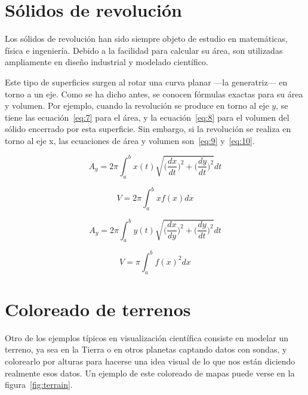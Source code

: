 \section{Sólidos de revolución}
\label{ref:revolution}

Los sólidos de revolución han sido siempre objeto de estudio en matemáticas,
física e ingeniería. Debido a la facilidad para calcular su área, son utilizadas
ampliamente en diseño industrial y modelado científico.

Este tipo de superficies surgen al rotar una curva planar ---la generatriz--- en
torno a un eje. Como se ha dicho antes, se conocen fórmulas exactas para su área
y volumen. Por ejemplo, cuando la revolución se produce en torno al eje $y$, se
tiene las ecuación~\eqref{eq:7} para el área, y la ecuación~\eqref{eq:8} para el
volumen del sólido encerrado por esta superficie. Sin embargo, si la revolución
se realiza en torno al eje x, las ecuaciones de área y volumen son~\eqref{eq:9}
y~\eqref{eq:10}.

\begin{equation} 
	A_y = 2\pi\int_{a}^{b}{x(t)\sqrt{\Big(\frac{dx}{dt}\Big)^2 +
		\Big(\frac{dy}{dt}\Big)^2}dt} \label{eq:7} 
\end{equation}

\begin{equation} 
		V = 2\pi\int_{a}^{b}{xf(x) dx} \label{eq:8} 
\end{equation}

\begin{equation} 
	A_y = 2\pi\int_{a}^{b}{y(t)\sqrt{\Big(\frac{dx}{dy}\Big)^2 +
		\Big(\frac{dy}{dt}\Big)^2}dt} \label{eq:9} 
\end{equation}

\begin{equation} 
		V = \pi\int_{a}^{b}{f(x)^2 dx} \label{eq:10} 
\end{equation}

\section{Coloreado de terrenos}
\label{ref:terrain}

Otro de los ejemplos típicos en visualización científica consiste en modelar un
terreno, ya sea en la Tierra o en otros planetas captando datos con sondas, y
colorearlo por alturas para hacerse una idea visual de lo que nos están diciendo
realmente esos datos. Un ejemplo de este coloreado de mapas puede verse en la
figura~\ref{fig:terrain}.

